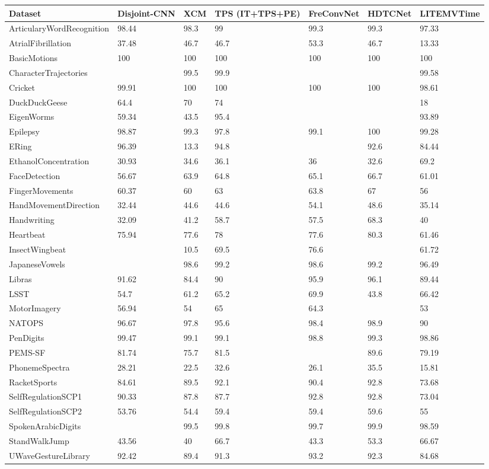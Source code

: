 \begin{tabular}{lllllll}
\toprule
Dataset & Disjoint-CNN & XCM & TPS (IT+TPS+PE) & FreConvNet & HDTCNet & LITEMVTime \\
\midrule
ArticularyWordRecognition & 98.44 & 98.3 & 99 & 99.3 & 99.3 & 97.33 \\
AtrialFibrillation & 37.48 & 46.7 & 46.7 & 53.3 & 46.7 & 13.33 \\
BasicMotions & 100 & 100 & 100 & 100 & 100 & 100 \\
CharacterTrajectories &  & 99.5 & 99.9 &  &  & 99.58 \\
Cricket & 99.91 & 100 & 100 & 100 & 100 & 98.61 \\
DuckDuckGeese & 64.4 & 70 & 74 &  &  & 18 \\
EigenWorms & 59.34 & 43.5 & 95.4 &  &  & 93.89 \\
Epilepsy & 98.87 & 99.3 & 97.8 & 99.1 & 100 & 99.28 \\
ERing & 96.39 & 13.3 & 94.8 &  & 92.6 & 84.44 \\
EthanolConcentration & 30.93 & 34.6 & 36.1 & 36 & 32.6 & 69.2 \\
FaceDetection & 56.67 & 63.9 & 64.8 & 65.1 & 66.7 & 61.01 \\
FingerMovements & 60.37 & 60 & 63 & 63.8 & 67 & 56 \\
HandMovementDirection & 32.44 & 44.6 & 44.6 & 54.1 & 48.6 & 35.14 \\
Handwriting & 32.09 & 41.2 & 58.7 & 57.5 & 68.3 & 40 \\
Heartbeat & 75.94 & 77.6 & 78 & 77.6 & 80.3 & 61.46 \\
InsectWingbeat &  & 10.5 & 69.5 & 76.6 &  & 61.72 \\
JapaneseVowels &  & 98.6 & 99.2 & 98.6 & 99.2 & 96.49 \\
Libras & 91.62 & 84.4 & 90 & 95.9 & 96.1 & 89.44 \\
LSST & 54.7 & 61.2 & 65.2 & 69.9 & 43.8 & 66.42 \\
MotorImagery & 56.94 & 54 & 65 & 64.3 &  & 53 \\
NATOPS & 96.67 & 97.8 & 95.6 & 98.4 & 98.9 & 90 \\
PenDigits & 99.47 & 99.1 & 99.1 & 98.8 & 99.3 & 98.86 \\
PEMS-SF & 81.74 & 75.7 & 81.5 &  & 89.6 & 79.19 \\
PhonemeSpectra & 28.21 & 22.5 & 32.6 & 26.1 & 35.5 & 15.81 \\
RacketSports & 84.61 & 89.5 & 92.1 & 90.4 & 92.8 & 73.68 \\
SelfRegulationSCP1 & 90.33 & 87.8 & 87.7 & 92.8 & 92.8 & 73.04 \\
SelfRegulationSCP2 & 53.76 & 54.4 & 59.4 & 59.4 & 59.6 & 55 \\
SpokenArabicDigits &  & 99.5 & 99.8 & 99.7 & 99.9 & 98.59 \\
StandWalkJump & 43.56 & 40 & 66.7 & 43.3 & 53.3 & 66.67 \\
UWaveGestureLibrary & 92.42 & 89.4 & 91.3 & 93.2 & 92.3 & 84.68 \\
\bottomrule
\end{tabular}
